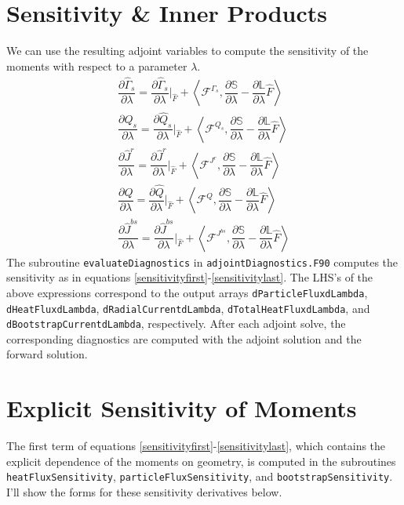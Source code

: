 \documentclass[11pt]{amsart}
\newcommand{\partder}[2]{\dfrac{\partial #1}{\partial #2}} %
\begin{document}
\section{Sensitivity \& Inner Products}
We can use the resulting adjoint variables to compute the sensitivity of the moments with respect to a parameter $\lambda$.
\begin{gather}
\label{sensitivityfirst}
\partder{\hat{\Gamma}_{s}}{\lambda} = \partder{\hat{\Gamma}_{s}}{\lambda} \bigg \rvert_{\hat{F}} + \left \langle \mathcal{F}^{\Gamma_{s}}, \partder{\mathbb{S}}{\lambda} - \partder{\mathbb{L}}{\lambda} \hat{F} \right \rangle \\
\partder{\hat{Q}_s}{\lambda} = \partder{\hat{Q}_s}{\lambda} \bigg \rvert_{\hat{F}} + \left \langle \mathcal{F}^{Q_s}, \partder{\mathbb{S}}{\lambda} - \partder{\mathbb{L}}{\lambda} \hat{F} \right \rangle \\
\partder{\hat{J}^r}{\lambda} = \partder{\hat{J}^r}{\lambda} \bigg \rvert_{\hat{F}} + \left \langle \mathcal{F}^{J^r}, \partder{\mathbb{S}}{\lambda} - \partder{\mathbb{L}}{\lambda} \hat{F} \right \rangle \\
\partder{\hat{Q}}{\lambda} = \partder{\hat{Q}}{\lambda} \bigg \rvert_{\hat{F}} + \left \langle \mathcal{F}^Q, \partder{\mathbb{S}}{\lambda} - \partder{\mathbb{L}}{\lambda} \hat{F} \right \rangle \\
\partder{\hat{J}^{bs}}{\lambda} = \partder{\hat{J}^{bs}}{\lambda} \bigg \rvert_{\hat{F}} + \left \langle \mathcal{F}^{J^{bs}}, \partder{\mathbb{S}}{\lambda} - \partder{\mathbb{L}}{\lambda} \hat{F} \right \rangle
\label{sensitivitylast}
\end{gather}
The subroutine \texttt{evaluateDiagnostics} in \texttt{adjointDiagnostics.F90} computes the sensitivity as in equations \ref{sensitivityfirst}-\ref{sensitivitylast}. The LHS's of the above expressions correspond to the output arrays \texttt{dParticleFluxdLambda}, \texttt{dHeatFluxdLambda}, \texttt{dRadialCurrentdLambda}, \texttt{dTotalHeatFluxdLambda}, and \texttt{dBootstrapCurrentdLambda}, respectively. After each adjoint solve, the corresponding diagnostics are computed with the adjoint solution and the forward solution.

\section{Explicit Sensitivity of Moments}
The first term of equations \ref{sensitivityfirst}-\ref{sensitivitylast}, which contains the explicit dependence of the moments on geometry, is computed in the subroutines \texttt{heatFluxSensitivity}, \texttt{particleFluxSensitivity}, and \texttt{bootstrapSensitivity}. I'll show the forms for these sensitivity derivatives below.
\end{document}
